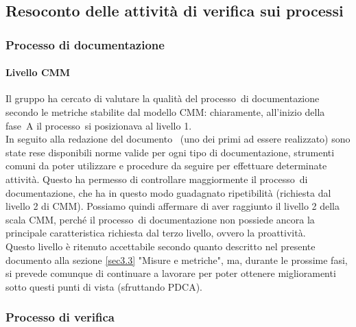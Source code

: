 \documentclass[../PianoDiQualifica.tex]{subfiles}
\begin{document}
\begin{appendices}
	\subsection{Resoconto delle attività di verifica sui processi}
		\subsubsection{Processo di documentazione}
			\paragraph{Livello CMM}
			Il gruppo ha cercato di valutare la qualità del processo\g\ di documentazione secondo le metriche stabilite dal modello CMM\g: chiaramente, all'inizio della fase\g\ A il processo\g\ si posizionava al livello 1.\\
			In seguito alla redazione del documento \normediprogetto\ (uno dei primi ad essere realizzato) sono state rese disponibili norme valide per ogni tipo di documentazione, strumenti comuni da poter utilizzare e procedure da seguire per effettuare determinate attività. Questo ha permesso di controllare maggiormente il processo\g\ di documentazione, che ha in questo modo guadagnato ripetibilità (richiesta dal livello 2 di CMM\g).
			Possiamo quindi affermare di aver raggiunto il livello 2 della scala CMM\g, perché il processo\g\ di documentazione non possiede ancora la principale caratteristica richiesta dal terzo livello, ovvero la proattività.\\
			Questo livello è ritenuto accettabile secondo quanto descritto nel presente documento alla sezione \ref{sec3.3} "Misure e metriche", ma, durante le prossime fasi, si prevede comunque di continuare a lavorare per poter ottenere miglioramenti sotto questi punti di vista (sfruttando PDCA\g).
		\subsubsection{Processo di verifica}

\end{appendices}
\end{document}
